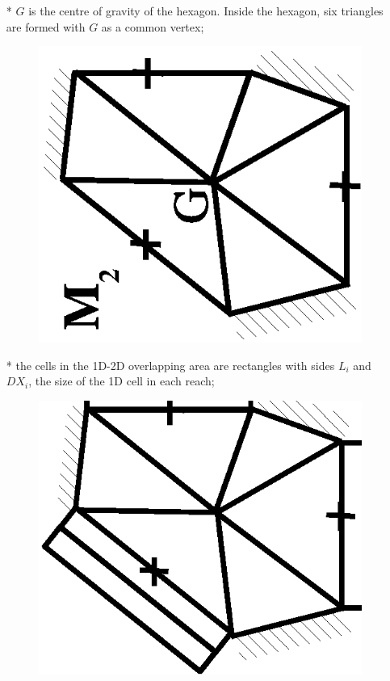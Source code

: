 \begin{itemize}
\begin{figure}[h]
\begin{center}
    \end{center}
  \end{figure}
  \newpage
 \item[*] $G$ is the centre of gravity of the hexagon. Inside the hexagon, six triangles are formed with $G$ as a common vertex;
  \begin{figure}[h]
    \begin{center}
     \includegraphics[scale=0.4,angle=270]{Figures/cr4.eps}
    \end{center}
  \end{figure}
  \vspace{0.5cm}
 \item[*] the cells in the 1D-2D overlapping area are rectangles with sides $L_i$ and $DX_i$, the size of the 1D cell in each reach;
  \begin{figure}[h]
    \begin{center}
     \includegraphics[scale=0.4,angle=270]{Figures/cr5.eps}

\end{center}
\end{figure}
\end{itemize}
